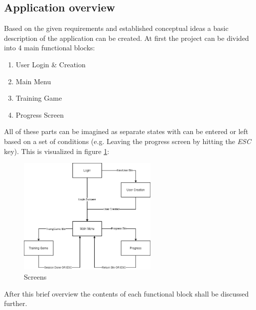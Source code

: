 \documentclass[a4paper,11pt]{article}%
\renewcommand{\\}{\vspace*{0.5\baselineskip} \newline}
\begin{document}
\subsection{Application overview}
Based on the given requirements and established conceptual ideas a basic description of the application can be created. At first the project can be divided into 4 main functional blocks:
\begin{enumerate}
\item User Login \& Creation
\item Main Menu
\item Training Game
\item Progress Screen
\end{enumerate}
All of these parts can be imagined as separate states with can be entered or left based on a set of conditions (e.g. Leaving the progress screen by hitting the \textit{ESC} key). This is visualized in figure \ref{fig:screens}:\vspace{5mm}
\begin{figure}[h!]
\centering
\includegraphics[width=0.6\textwidth]{screens2.png}
\caption{Screens}
\label{fig:screens}
\vspace{3mm}
\end{figure}
\newline
After this brief overview the contents of each functional block shall be discussed further.
\end{document}
